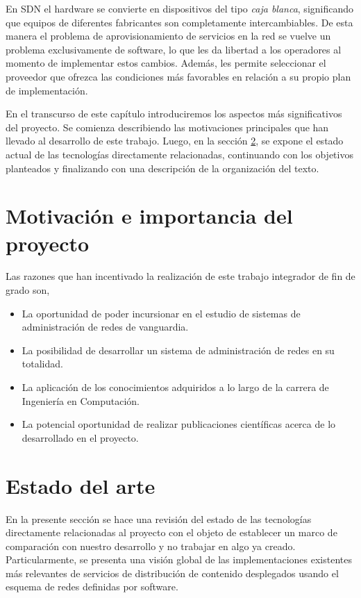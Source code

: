 En SDN el hardware se convierte en dispositivos del tipo \textit{caja blanca}, significando que equipos de diferentes fabricantes son completamente intercambiables. De esta manera el problema de aprovisionamiento de servicios en la red se vuelve un problema exclusivamente de software, lo que les da libertad a los operadores al momento de implementar estos cambios. Además, les permite seleccionar el proveedor que ofrezca las condiciones más favorables en relación a su propio plan de implementación.

En el transcurso de este capítulo introduciremos los aspectos más significativos del proyecto. Se comienza describiendo las motivaciones principales que han llevado al desarrollo de este trabajo. Luego, en la sección \ref{Estado_Arte}, se expone el estado actual de las tecnologías directamente relacionadas, continuando con los objetivos planteados y finalizando con una descripción de la organización del texto.

\section{Motivación e importancia del proyecto}

Las razones que han incentivado la realización de este trabajo integrador de fin de grado son,

\begin{itemize}     
    \item La oportunidad de poder incursionar en el estudio de sistemas de administración de redes de vanguardia.
    \item La posibilidad de desarrollar un sistema de administración de redes en su totalidad.
    \item La aplicación de los conocimientos adquiridos a lo largo de la carrera de Ingeniería en Computación.
    \item La potencial oportunidad de realizar publicaciones científicas acerca de lo desarrollado en el proyecto.
\end{itemize}
    
\section{Estado del arte} \label{Estado_Arte} %

En la presente sección se hace una revisión del estado de las tecnologías directamente relacionadas al proyecto con el objeto de establecer un marco de comparación con nuestro desarrollo y no trabajar en algo ya creado. Particularmente, se presenta una visión global de las implementaciones existentes más relevantes de servicios de distribución de contenido desplegados usando el esquema de redes definidas por software.   

